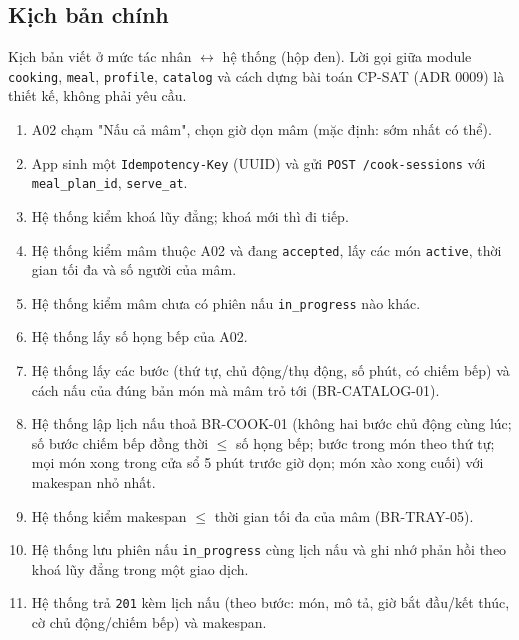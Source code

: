 \subsection{Kịch bản chính}
Kịch bản viết ở mức tác nhân \ensuremath{\leftrightarrow} hệ thống (hộp đen). Lời gọi giữa module {\small\texttt{cooking}}, {\small\texttt{meal}}, {\small\texttt{profile}}, {\small\texttt{catalog}} và cách dựng bài toán CP-\allowbreak{}SAT (ADR 0009) là thiết kế, không phải yêu cầu.

\begin{enumerate}
\item A02 chạm "Nấu cả mâm", chọn giờ dọn mâm (mặc định: sớm nhất có thể).
\item App sinh một {\small\texttt{Idempotency-\allowbreak{}Key}} (UUID) và gửi {\small\texttt{POST /\allowbreak{}\allowbreak{}cook-\allowbreak{}sessions}} với {\small\texttt{meal\_\allowbreak{}\allowbreak{}plan\_\allowbreak{}\allowbreak{}id}}, {\small\texttt{serve\_\allowbreak{}\allowbreak{}at}}.
\item Hệ thống kiểm khoá lũy đẳng; khoá mới thì đi tiếp.
\item Hệ thống kiểm mâm thuộc A02 và đang {\small\texttt{accepted}}, lấy các món {\small\texttt{active}}, thời gian tối đa và số người của mâm.
\item Hệ thống kiểm mâm chưa có phiên nấu {\small\texttt{in\_\allowbreak{}\allowbreak{}progress}} nào khác.
\item Hệ thống lấy số họng bếp của A02.
\item Hệ thống lấy các bước (thứ tự, chủ động/\allowbreak{}thụ động, số phút, có chiếm bếp) và cách nấu của đúng bản món mà mâm trỏ tới (BR-\allowbreak{}CATALOG-\allowbreak{}01).
\item Hệ thống lập lịch nấu thoả BR-\allowbreak{}COOK-\allowbreak{}01 (không hai bước chủ động cùng lúc; số bước chiếm bếp đồng thời \ensuremath{\leq} số họng bếp; bước trong món theo thứ tự; mọi món xong trong cửa sổ 5 phút trước giờ dọn; món xào xong cuối) với makespan nhỏ nhất.
\item Hệ thống kiểm makespan \ensuremath{\leq} thời gian tối đa của mâm (BR-\allowbreak{}TRAY-\allowbreak{}05).
\item Hệ thống lưu phiên nấu {\small\texttt{in\_\allowbreak{}\allowbreak{}progress}} cùng lịch nấu và ghi nhớ phản hồi theo khoá lũy đẳng trong một giao dịch.
\item Hệ thống trả {\small\texttt{201}} kèm lịch nấu (theo bước: món, mô tả, giờ bắt đầu/\allowbreak{}kết thúc, cờ chủ động/\allowbreak{}chiếm bếp) và makespan.

\end{enumerate}
